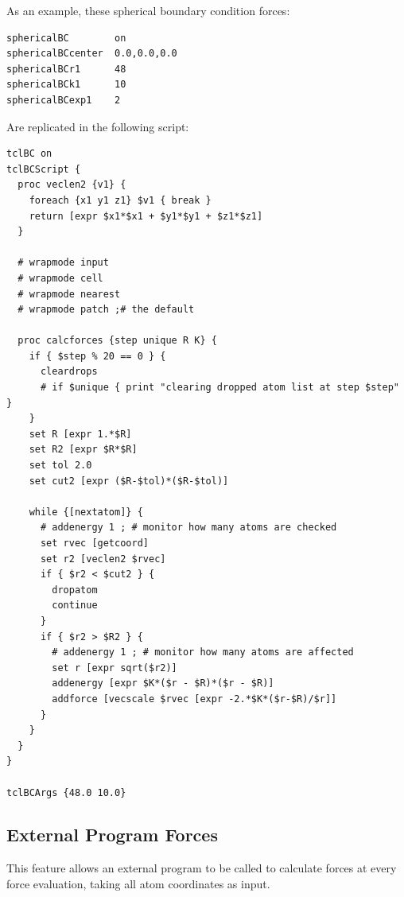 As an example, these spherical boundary condition forces:

\begin{verbatim}
sphericalBC        on
sphericalBCcenter  0.0,0.0,0.0
sphericalBCr1      48
sphericalBCk1      10
sphericalBCexp1    2
\end{verbatim}

Are replicated in the following script:

\begin{verbatim}
tclBC on
tclBCScript {
  proc veclen2 {v1} {
    foreach {x1 y1 z1} $v1 { break }
    return [expr $x1*$x1 + $y1*$y1 + $z1*$z1]
  }

  # wrapmode input
  # wrapmode cell
  # wrapmode nearest
  # wrapmode patch ;# the default

  proc calcforces {step unique R K} {
    if { $step % 20 == 0 } {
      cleardrops
      # if $unique { print "clearing dropped atom list at step $step" }
    }
    set R [expr 1.*$R]
    set R2 [expr $R*$R]
    set tol 2.0
    set cut2 [expr ($R-$tol)*($R-$tol)]

    while {[nextatom]} {
      # addenergy 1 ; # monitor how many atoms are checked
      set rvec [getcoord]
      set r2 [veclen2 $rvec]
      if { $r2 < $cut2 } {
        dropatom
        continue
      }
      if { $r2 > $R2 } {
        # addenergy 1 ; # monitor how many atoms are affected
        set r [expr sqrt($r2)]
        addenergy [expr $K*($r - $R)*($r - $R)]
        addforce [vecscale $rvec [expr -2.*$K*($r-$R)/$r]]
      }
    }
  }
}

tclBCArgs {48.0 10.0}
\end{verbatim}


\subsection{External Program Forces}
\label{section:extForces}

This feature allows an external program to be called to calculate forces
at every force evaluation, taking all atom coordinates as input.

